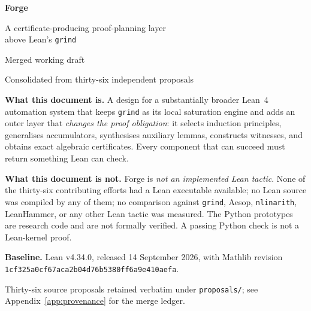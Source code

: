\documentclass[11pt,a4paper]{article}
\theoremstyle{plain}
\theoremstyle{definition}
\theoremstyle{remark}
\newcommand{\forge}{\textsf{Forge}}
\newcommand{\grind}{\texttt{grind}}
\newcommand{\code}[1]{\texttt{#1}}
\begin{document}
\begin{titlepage}
\centering
\vspace*{2.5cm}

{\sffamily\Huge\bfseries\color{Accent} Forge\par}
\vspace{0.8cm}
{\sffamily\LARGE A certificate-producing proof-planning layer\\[0.25em]
above Lean's \texttt{grind}\par}

\vspace{1.4cm}
{\large Merged working draft\par}
\vspace{0.4cm}
{\large Consolidated from thirty-six independent proposals\par}

\vspace{2.2cm}
\begin{minipage}{0.82\textwidth}
\small
\setlength{\parskip}{0.7em}

\textbf{What this document is.} A design for a substantially broader Lean~4
automation system that keeps \grind{} as its local saturation engine and adds
an outer layer that \emph{changes the proof obligation}: it selects induction
principles, generalises accumulators, synthesises auxiliary lemmas, constructs
witnesses, and obtains exact algebraic certificates. Every component that can
succeed must return something Lean can check.

\textbf{What this document is not.} \forge{} is \emph{not an implemented Lean
tactic}. None of the thirty-six contributing efforts had a Lean executable
available; no Lean source was compiled by any of them; no comparison against
\grind{}, Aesop, \code{nlinarith}, LeanHammer, or any other Lean tactic was
measured. The Python prototypes are research code and are not formally
verified. A passing Python check is not a Lean-kernel proof.

\textbf{Baseline.} Lean v4.34.0, released 14 September 2026, with Mathlib
revision \texttt{1cf325a0cf67aca2b04d76b5380ff6a9e410aefa}.

\end{minipage}

\vfill
{\small Thirty-six source proposals retained verbatim under
\texttt{proposals/}; see Appendix~\ref{app:provenance} for the merge
ledger.\par}
\end{titlepage}

\tableofcontents
\clearpage
\end{document}
